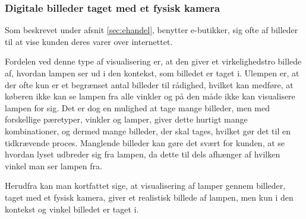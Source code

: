 \subsubsection{Digitale billeder taget med et fysisk kamera}
Som beskrevet under afsnit \ref{sec:ehandel}, benytter e-butikker, sig ofte af billeder til at vise kunden deres varer over internettet.

Fordelen ved denne type af visualisering er, at den giver et virkelighedstro billede af, hvordan lampen ser ud i den kontekst, som billedet er taget i. Ulempen er, at der ofte kun er et begrænset antal billeder til rådighed, hvilket kan medføre, at køberen ikke kan se lampen fra alle vinkler og på den måde ikke kan visualisere lampen for sig. Det er dog en mulighed at tage mange billeder, men med forskellige pæretyper, vinkler og lamper, giver dette hurtigt mange kombinationer, og dermed mange billeder, der skal tages, hvilket gør det til en tidkrævende proces. Manglende billeder kan gøre det svært for kunden, at se hvordan lyset udbreder sig fra lampen, da dette til dels afhænger af hvilken vinkel man ser lampen fra. 

Herudfra kan man kortfattet sige, at visualisering af lamper gennem billeder, taget med et fysisk kamera, giver et realistisk billede af lampen, men kun i den kontekst og vinkel billedet er taget i. 
